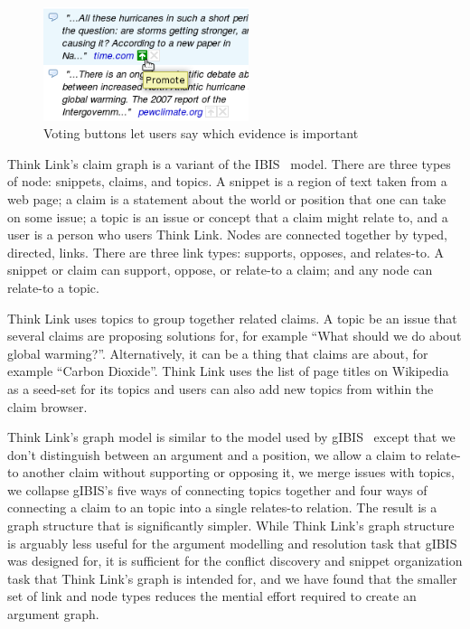 \documentclass{chi2009}
\newcommand{\todo}[1]{}
\begin{document}
\begin{figure}[tb]
	\begin{center}
	\includegraphics[width=6cm]{../screenshots/v2_vote.png}
	\caption{Voting buttons let users say which evidence is important}
	\label{voting}
	\end{center}
\end{figure}


Think Link's claim graph is a variant of the IBIS~\cite{Rittel1973} model. There are three types of node: snippets, claims, and topics. A snippet is a region of text taken from a web page; a claim is a statement about the world or position that one can take on some issue; a topic is an issue or concept that a claim might relate to, and a user is a person who users Think Link. Nodes are connected together by typed, directed, links. There are three link types: supports, opposes, and relates-to. A snippet or claim can support, oppose, or relate-to a claim; and any node can relate-to a topic. 

Think Link uses topics to group together related claims. A topic be an issue that several claims are proposing solutions for, for example ``What should we do about global warming?''. Alternatively, it can be a thing that claims are about, for example ``Carbon Dioxide''. Think Link uses the list of page titles on Wikipedia as a seed-set for its topics and users can also add new topics from within the claim browser.

Think Link's graph model is similar to the model used by gIBIS~\cite{Conklin1987} except that we don't distinguish between an argument and a position, we allow a claim to relate-to another claim without supporting or opposing it, we merge issues with topics, we collapse gIBIS's five ways of connecting topics together and four ways of connecting a claim to an topic into a single relates-to relation. The result is a graph structure that is significantly simpler. While Think Link's graph structure is arguably less useful for the argument modelling and resolution task that gIBIS was designed for, it is sufficient for the conflict discovery and snippet organization task that Think Link's graph is intended for, and we have found that the smaller set of link and node types reduces the mential effort required to create an argument graph.
\end{document}
